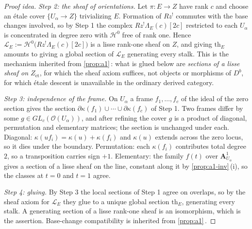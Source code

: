 \documentclass[11pt]{article}
\theoremstyle{plain}
\theoremstyle{definition}
\newcommand{\Aaf}{\mathbf A}
\newcommand{\Et}{\mathrm{\acute{e}t}}
\newcommand{\Cref}[1]{\hyperref[#1]{\ref{#1}}\,\hyperref[#1]{\nameref*{#1}}}
\begin{document}
\begin{proof}[Proof idea]
\emph{Step 2: the sheaf of orientations.}  Let $\pi:E\to Z$ have rank $c$ and
choose an \'etale cover $\{U_\alpha\to Z\}$ trivializing $E$.  Formation of
$Rz^{!}$ commutes with the base changes involved, so by Step 1 the complex
$Rz^{!}\Lambda_E(c)[2c]$ restricted to each $U_\alpha$ is concentrated in
degree zero with $\mathcal H^0$ free of rank one.  Hence
$\mathcal L_E:=\mathcal H^0\bigl(Rz^{!}\Lambda_E(c)[2c]\bigr)$ is a lisse
rank-one sheaf on $Z$, and giving $\mathrm{th}_E$ amounts to giving a global
section of $\mathcal L_E$ generating every stalk.  This is the mechanism
inherited from \Cref{prop:a1}:  what is glued below are \emph{sections of a
lisse sheaf on $Z_{\Et}$}, for which the sheaf axiom suffices, not objects or
morphisms of $D^b$, for which \'etale descent is unavailable in the ordinary
derived category.

\emph{Step 3: independence of the frame.}  On $U_\alpha$ a frame
$f_1,\dots,f_c$ of the ideal of the zero section gives the section
$\partial\kappa(f_1)\cup\cdots\cup\partial\kappa(f_c)$ of Step 1.  Two frames
differ by some $g\in GL_c(\mathcal O(U_\alpha))$, and after refining the cover
$g$ is a product of diagonal, permutation and elementary matrices; the
section is unchanged under each.  Diagonal:
$\kappa(uf_i)=\kappa(u)+\kappa(f_i)$ and $\kappa(u)$ extends across the zero
locus, so it dies under the boundary.  Permutation: each $\kappa(f_i)$
contributes total degree $2$, so a transposition carries sign $+1$.
Elementary: the family $f(t)$ over $\Aaf^1_{U_\alpha}$ gives a section of a
lisse sheaf on the line, constant along it by \Cref{prop:a1-inv}(i), so the
classes at $t=0$ and $t=1$ agree.

\emph{Step 4: gluing.}  By Step 3 the local sections of Step 1 agree on
overlaps, so by the sheaf axiom for $\mathcal L_E$ they glue to a unique
global section $\mathrm{th}_E$, generating every stalk.  A generating section
of a lisse rank-one sheaf is an isomorphism, which is the assertion.  Base-change
compatibility is inherited from \Cref{prop:a1}.


\end{proof}
\end{document}
